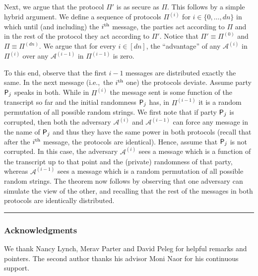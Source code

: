 \documentclass[11pt]{article}
\theoremstyle{plain}
\theoremstyle{definition}
\numberwithin{equation}{section}
\newcommand{\qedsymb}{\hfill{\rule{2mm}{2mm}}}
\newenvironment{proofsketch}{\begin{trivlist} \item[\hspace{\labelsep}{\bf
\noindent Proof Sketch.\/}] }{\qedsymb\end{trivlist}}
\numberwithin{equation}{section} \newcommand{\aka} {also known as\ }
\newcommand{\ie}  {i.e.,\ }
\newcommand{\1}{\mathbf{1}}
\newcommand{\Adv}{\mathcal A}
\newcommand{\ith}[1]{{#1}\textsuperscript{th}}
\theoremstyle{remark}
\begin{document}
\begin{proofsketch}
  Next, we argue that the protocol $\Pi'$ is as secure as $\Pi$.
  This follows by a simple hybrid argument. We define a sequence of protocols
  $\Pi^{(i)}$ for $i\in\{0,\dots,dn\}$ in which until (and including) the
  $\ith{i}$ message, the parties act according to $\Pi$ and in the rest of the
  protocol they act according to $\Pi'$. Notice that $\Pi' \equiv \Pi^{(0)}$ and
  $\Pi \equiv \Pi^{(dn)}$. We argue that for every $i\in[dn]$, the ``advantage''
  of any $\Adv^{(i)}$ in $\Pi^{(i)}$ over any $\Adv^{(i-1)}$ in $\Pi^{(i-1)}$ is
  zero.


  To this end, observe that the first $i-1$ messages are distributed exactly the
  same.
  In the next message (\ie the $\ith{i}$ one) the protocols deviate. Assume
  party $\mathsf{P}_{{j}}$ speaks in both. While in $\Pi^{(i)}$ the message sent is
  some function of the transcript so far and the initial randomness $\mathsf{P}_{{j}}$
  has, in $\Pi^{(i-1)}$ it is a random permutation of all possible random
  strings. We first note that if party $\mathsf{P}_{{j}}$ is corrupted, then both the
  adversary $\Adv^{(i)}$ and $\Adv^{(i-1)}$ can force any message in the name of
  $\mathsf{P}_{{j}}$ and thus they have the same power in both protocols (recall that
  after the $\ith{i}$ message, the protocols are identical). Hence, assume that
  $\mathsf{P}_{{j}}$ is not corrupted. In this case, the adversary $\Adv^{(i)}$ sees a
  message which is a function of the transcript up to that point and the
  (private) randomness of that party, whereas $\Adv^{(i-1)}$ sees a message
  which is a random permutation of all possible random strings. The theorem now
  follows by observing that one adversary can simulate the view of the other,
  and recalling that the rest of the messages in both protocols are
  identically distributed.
\end{proofsketch}

\subsubsection*{Acknowledgments}
We thank Nancy Lynch, Merav Parter and David Peleg for helpful remarks and
pointers. The second author thanks his advisor Moni Naor for his continuous
support.




\end{document}
